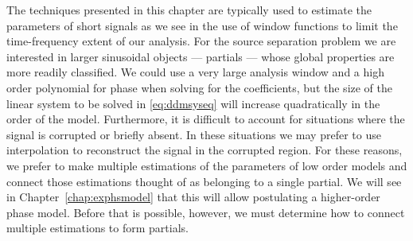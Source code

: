The techniques presented in this chapter are typically used to estimate the
parameters of short signals as we see in the use of window functions to limit
the time-frequency extent of our analysis. For the source separation problem we
are interested in larger sinusoidal objects --- partials --- whose global
properties are more readily classified. We could use a very large
analysis window and a high order polynomial for phase when solving for the
coefficients, but the size of the linear system to be solved in
\ref{eq:ddmsyseq} will increase quadratically in the order of the model.
Furthermore, it is difficult to account for situations where the signal is
corrupted or briefly absent. In these situations we may prefer to use
interpolation to reconstruct the signal in the corrupted region. For these
reasons, we prefer to make multiple estimations of the parameters of low order
models and connect those estimations thought of as belonging to a single
partial. We will see in Chapter~\ref{chap:exphsmodel} that this will allow
postulating a higher-order phase model. Before that is possible, however, we
must determine how to connect multiple estimations to form partials.
